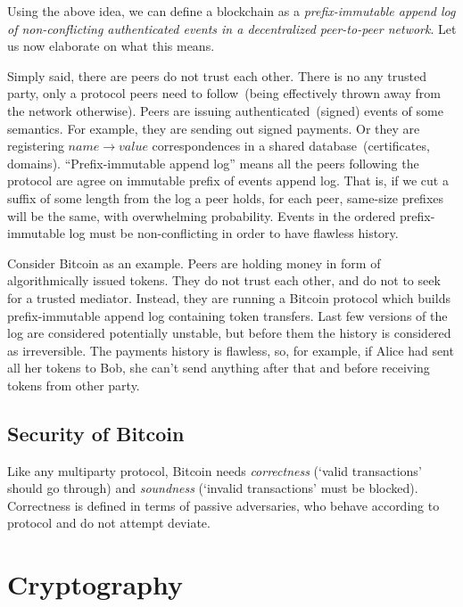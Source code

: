 \documentclass[]{report}   %
\begin{document}
Using the above idea, we can define a blockchain as a {\em prefix-immutable append log of non-conflicting authenticated events in a decentralized peer-to-peer network}. Let us now elaborate on what this means.

Simply said, there are peers do not trust each other. There is no any trusted party, only a protocol peers need to follow~(being effectively thrown away from the network otherwise). Peers are issuing authenticated~(signed) events of some semantics. For example, they are sending out signed payments. Or they are registering \(name \rightarrow value\) correspondences in a shared database~(certificates, domains). ``Prefix-immutable append log'' means all the peers following the protocol are agree on immutable prefix of events append log. That is, if we cut a suffix of some length from the log a peer holds, for each peer, same-size prefixes will be the same, with overwhelming probability. Events in the ordered prefix-immutable log must be non-conflicting in order to have flawless history.

Consider Bitcoin as an example. Peers are holding money in form of algorithmically issued tokens. They do not trust each other, and do not to seek for a trusted mediator. Instead, they are running a Bitcoin protocol which builds prefix-immutable append log containing token transfers. Last few versions of the log are considered potentially unstable, but before them the history is considered as irreversible. The payments history is flawless, so, for example, if Alice had sent all her tokens to Bob, she can't send anything after that and before receiving tokens from other party.

\subsection{Security of Bitcoin}

Like any multiparty protocol, Bitcoin needs {\em correctness} (`valid transactions' should go through) and {\em soundness} (`invalid transactions' must be blocked). Correctness is defined in terms of passive adversaries, who behave according to protocol and do not attempt deviate. 


\section{Cryptography}
\end{document}
